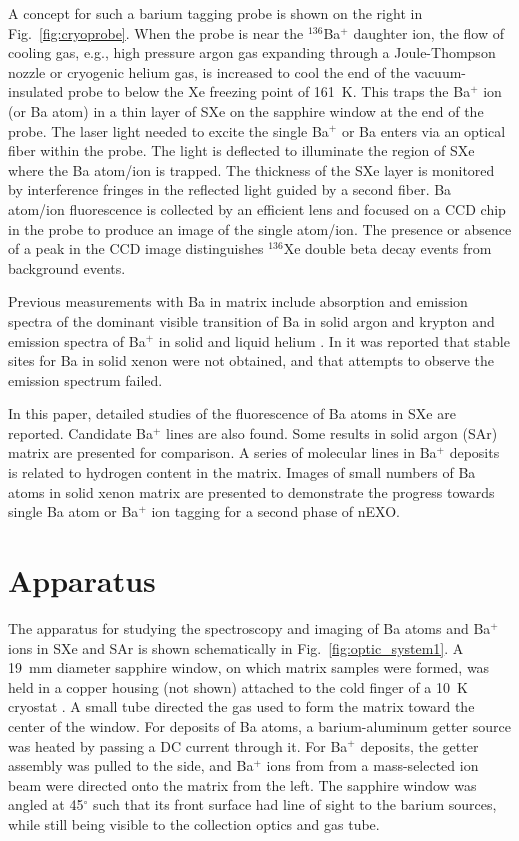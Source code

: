 \documentclass[aps,pra,reprint,superscriptaddress]{revtex4-1}
\begin{document}
A concept for such a barium tagging probe is shown on the right in Fig.~\ref{fig:cryoprobe}.
When the probe is near the $^{136}$Ba$^+$ daughter ion, the flow of cooling gas, e.g., high pressure argon gas expanding through a Joule-Thompson nozzle or cryogenic helium gas, is increased to cool the end of the vacuum-insulated probe to below the Xe freezing point of 161~K.
This traps the Ba$^+$ ion (or Ba atom) in a thin layer of SXe on the sapphire window at the end of the probe.
The laser light needed to excite the single Ba$^+$ or Ba enters via an optical fiber within the probe.  
The light is deflected to illuminate the region of SXe where the Ba atom/ion is trapped.  
The thickness of the SXe layer is monitored by interference fringes in the reflected light guided by a second fiber.
Ba atom/ion fluorescence is collected by an efficient lens and focused on a CCD chip in the probe to produce an image of the single atom/ion.
The presence or absence of a peak in the CCD image distinguishes $^{136}$Xe double beta decay events from background events.

Previous measurements with Ba in matrix include absorption and emission spectra of the dominant visible transition of Ba in solid argon and krypton \cite{Balling1985} and  emission spectra of Ba$^+$ in solid and liquid helium \cite{Kanorsky1994,Lebedev2011}. 
In \cite{Balling1985} it was reported that stable sites for Ba in solid xenon were not obtained, and that attempts to observe the emission spectrum failed. 

In this paper, detailed studies of the fluorescence of Ba atoms in SXe are reported.
Candidate Ba$^+$ lines are also found.  
Some results in solid argon (SAr) matrix are presented for comparison.
A series of molecular lines in Ba$^+$ deposits is related to hydrogen content in the matrix.
Images of small numbers of Ba atoms in solid xenon matrix are presented to demonstrate the progress towards single Ba atom or Ba$^+ $ ion tagging for a second phase of nEXO.

\section{Apparatus}
The apparatus for studying the spectroscopy and imaging of Ba atoms and Ba$^+ $ ions in SXe and SAr is shown schematically in Fig.~\ref{fig:optic_system1}.
A 19~mm diameter sapphire window, on which matrix samples were formed, was held in a copper housing (not shown) attached to the cold finger of a 10~K cryostat \cite{Cryostat}.
A small tube directed the gas used to form the matrix toward the center of the window.
For deposits of Ba atoms, a barium-aluminum getter source \cite{SAES} was heated by passing a DC current through it.
For Ba$^+ $ deposits, the getter assembly was pulled to the side, and Ba$^+$ ions from from a mass-selected ion beam were directed onto the matrix from the left.
The sapphire window was angled at 45$^{\circ}$ such that its front surface had line of sight to the barium sources, while still being visible to the collection optics and gas tube.  
\end{document}
